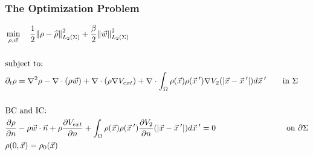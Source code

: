 \documentclass[aspectratio=169,xcolor=dvipsnames]{beamer}
\begin{document}
\begin{frame}
	\frametitle{The Optimization Problem}
	
	
	\begin{align*}
		&\min_{\rho,\vec{w}} \quad \frac{1}{2}\norm{\rho- \widehat{\rho}}_{L_2(\Sigma)}^2 + \frac{\beta}{2} \norm{\vec{w}}_{L_2(\Sigma)}^2\\
		\\
		&\text{subject to:}
		\\
		& \partial_t \rho = \nabla^2 \rho - \nabla \cdot (\rho \vec{w}) + \nabla \cdot \left(\rho \nabla V_{ext}\right) + \nabla \cdot \int_\Omega \rho(\vec{x}) \rho(\vec{x}\hspace{0.2em}') \nabla V_2(|\vec{x}-\vec{x}\hspace{0.2em}'|)d\vec{x}\hspace{0.2em}' \qquad { \text{in    } \Sigma}\\
		\\
		&{\text{BC } \text{and IC:}}\\
		&\frac{\partial \rho}{\partial n} - \rho \vec{w} \cdot \vec{n} + \rho \frac{\partial V_{ext}}{\partial n} +   \int_\Omega \rho(\vec{x}) \rho(\vec{x}\hspace{0.2em}')  \frac{ \partial  V_2}{\partial n}(|\vec{x}-\vec{x}\hspace{0.2em}'|)d\vec{x}\hspace{0.2em}'= 0 \quad \ \ \qquad \qquad \qquad \quad \text{on   } \partial \Sigma   \\
		&{\rho(0,\vec{x}) = \rho_0(\vec{x})} 
	\end{align*}
\end{frame}
\end{document}
